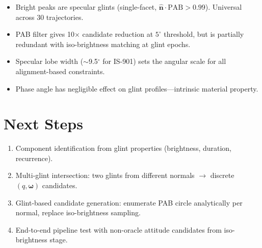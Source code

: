 \documentclass[11pt,a4paper]{article}
\begin{document}
\begin{itemize}[nosep]
  \item Bright peaks are specular glints (single-facet, $\hat{\mathbf{n}} \cdot \text{PAB} > 0.99$). Universal across 30 trajectories.
  \item PAB filter gives 10$\times$ candidate reduction at $5^\circ$ threshold, but is partially redundant with iso-brightness matching at glint epochs.
  \item Specular lobe width ($\sim$9.5$^\circ$ for IS-901) sets the angular scale for all alignment-based constraints.
  \item Phase angle has negligible effect on glint profiles---intrinsic material property.
\end{itemize}

\section{Next Steps}

\begin{enumerate}[nosep]
  \item Component identification from glint properties (brightness, duration, recurrence).
  \item Multi-glint intersection: two glints from different normals $\to$ discrete $(q, \boldsymbol{\omega})$ candidates.
  \item Glint-based candidate generation: enumerate PAB circle analytically per normal, replace iso-brightness sampling.
  \item End-to-end pipeline test with non-oracle attitude candidates from iso-brightness stage.
\end{enumerate}
\end{document}
